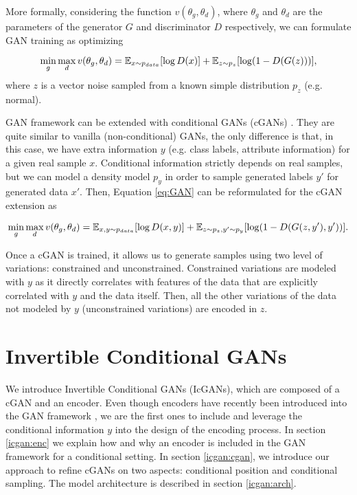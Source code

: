 \documentclass{article}
\begin{document}
More formally, considering the function $v(\theta_g,\theta_d)$, where $\theta_g$ and $\theta_d$ are the parameters of the generator $G$ and discriminator $D$ respectively, we can formulate GAN training as optimizing

\begin{equation}
\operatornamewithlimits{min}\limits_{g} \operatornamewithlimits{max}\limits_{d} v(\theta_g,\theta_d) = \mathbb{E}_{x\sim p_{data}} [\log D(x)] + \mathbb{E}_{z\sim p_z}[ \log(1-D(G(z)))],
\label{eq:GAN}
\end{equation}
where $z$ is a vector noise sampled from a known simple distribution $p_z$ (e.g. normal).
 
GAN framework can be extended with conditional GANs (cGANs) \citep{Mirza2014}. They are quite similar to vanilla (non-conditional) GANs, the only difference is that, in this case, we have extra information $y$ (e.g. class labels, attribute information) for a given real sample $x$. Conditional information strictly depends on real samples, but we can model a density model $p_y$ in order to sample generated labels $y'$ for generated data $x'$. Then, Equation \ref{eq:GAN} can be reformulated for the cGAN extension as

\begin{equation}
\operatornamewithlimits{min}\limits_{g} \operatornamewithlimits{max}\limits_{d} v(\theta_g,\theta_d) = \mathbb{E}_{x,y\sim p_{data}} [\log D(x,y)] + \mathbb{E}_{z\sim p_z, y'\sim p_y}[ \log(1-D(G(z,y'),y'))].
\label{eq:cGAN}
\end{equation} 



Once a cGAN is trained, it allows us to generate samples using two level of variations: constrained and unconstrained. Constrained variations are modeled with $y$ as it directly correlates with features of the data that are explicitly correlated with $y$ and the data itself. Then, all the other variations of the data not modeled by $y$ (unconstrained variations) are encoded in $z$.
 
\section{Invertible Conditional GANs} \label{sec:IcGANs}
We introduce Invertible Conditional GANs (IcGANs), which are composed of a cGAN and an encoder. Even though encoders have recently been introduced into the GAN framework \cite{Dumoulin2016,Donahue2016,Reed2016}, we are the first ones to include and leverage the conditional information $y$ into the design of the encoding process. In section \ref{icgan:enc} we explain how and why an encoder is included in the GAN framework for a conditional setting. In section \ref{icgan:cgan}, we introduce our approach to refine cGANs on two aspects: conditional position and conditional sampling. The model architecture is described in section \ref{icgan:arch}.
\end{document}
